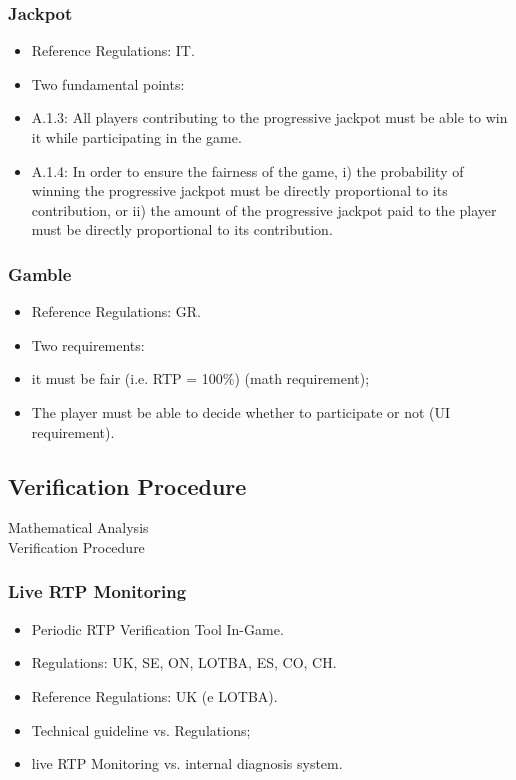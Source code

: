 \documentclass{beamer}
\begin{document}
\begin{frame}
\frametitle{Jackpot}
\begin{itemize}
\item<1-> Reference Regulations: IT.
\item<2-> Two fundamental points:
\item<3-> A.1.3: All players contributing to the progressive jackpot must be able to win it while participating in the game.
\item<4-> A.1.4: In order to ensure the fairness of the game, i) the probability of winning the progressive jackpot must be directly proportional to its contribution, or ii) the amount of the progressive jackpot paid to the player must be directly proportional to its contribution.
\end{itemize}
\end{frame}

\begin{frame}
\frametitle{Gamble}
\begin{itemize}
\item<1-> Reference Regulations: GR.
\item<2-> Two requirements:
\item<3-> it must be fair (i.e. RTP = 100\%) (math requirement);
\item<4-> The player must be able to decide whether to participate or not (UI requirement).
\end{itemize}
\end{frame}

\begin{frame}
\section{Verification Procedure}
\centering \Large Mathematical Analysis \\ \large Verification Procedure
\end{frame}

\begin{frame}
\frametitle{Live RTP Monitoring}
\begin{itemize}
\item<1-> Periodic RTP Verification Tool In-Game.
\item<2-> Regulations: UK, SE, ON, LOTBA, ES, CO, CH.
\item<3-> Reference Regulations: UK (e LOTBA).
\item<4-> Technical guideline vs. Regulations;
\item<5-> live RTP Monitoring vs. internal diagnosis system.
\end{itemize}
\end{frame}
\end{document}
